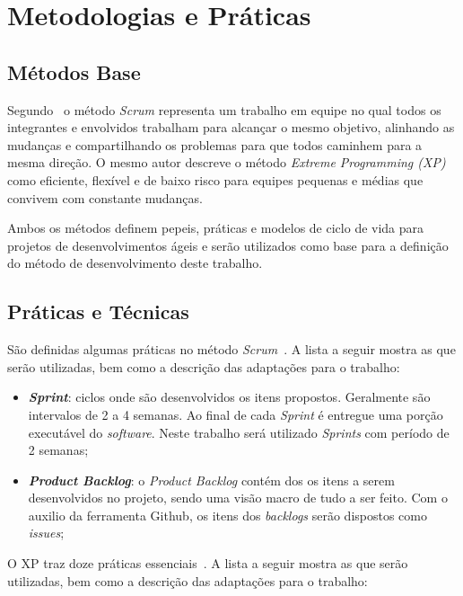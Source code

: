 \section{Metodologias e Práticas}
\subsection{Métodos Base}
\label{sec:metodo_base}

Segundo~ o método \textit{Scrum} representa um trabalho
em equipe no qual todos os integrantes e envolvidos trabalham para alcançar
o mesmo objetivo, alinhando as mudanças e compartilhando os problemas para que
todos caminhem para a mesma direção. O mesmo autor descreve o método
\textit{Extreme Programming (XP)} como eficiente, flexível e de baixo risco para equipes
pequenas e médias que convivem com constante mudanças.

Ambos os métodos definem pepeis, práticas e modelos de ciclo de vida para
projetos de desenvolvimentos ágeis e serão utilizados como base para a definição
do método de desenvolvimento deste trabalho.

\subsection{Práticas e Técnicas}
\label{sec:praticas_tecnicas}

São definidas algumas práticas no método \textit{Scrum}~\cite{gutierrez:2009}. A lista a seguir
mostra as que serão utilizadas, bem como a descrição das adaptações para o trabalho:

\begin{itemize}
  \item \textit{\textbf{Sprint}}: ciclos onde são desenvolvidos os itens propostos. Geralmente
    são intervalos de 2 a 4 semanas. Ao final de cada \textit{Sprint} é entregue uma porção 
    executável do \textit{software}. Neste trabalho será utilizado \textit{Sprints} com período
    de 2 semanas;
  \item \textbf{\textit{Product Backlog}}: o \textit{Product Backlog} contém dos os itens a serem
    desenvolvidos no projeto, sendo uma visão macro de tudo a ser feito.
    Com o auxilio da ferramenta Github, os itens dos \textit{backlogs} serão dispostos
    como \textit{issues};
\end{itemize}

O XP traz doze práticas essenciais~\cite{gutierrez:2009}. A lista a seguir
mostra as que serão utilizadas, bem como a descrição das adaptações para o trabalho:

